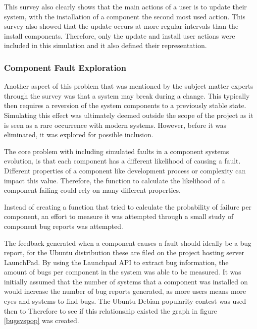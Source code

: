 This survey also clearly shows that the main actions of a user is to update their system,
with the installation of a component the second most used action.
This survey also showed that the update occurs at more regular intervals than the install components.
Therefore, only the update and install user actions were included in this simulation and it also defined their representation. 

\subsubsection{Component Fault Exploration}
Another aspect of this problem that was mentioned by the subject matter experts through the survey was that a system may break during a change.
This typically then requires a reversion of the system components to a previously stable state.
Simulating this effect was ultimately deemed outside the scope of the project as it is seen as a rare occurrence with modern systems.
However, before it was eliminated, it was explored for possible inclusion.

The core problem with including simulated faults in a component systems evolution, is that each component has a different likelihood of causing a fault.
Different properties of a component like development process or complexity can impact this value.
Therefore, the function to calculate the likelihood of a component failing could rely on many different properties.

Instead of creating a function that tried to calculate the probability of failure per component,
an effort to measure it was attempted through a small study of component bug reports was attempted.

The feedback generated when a component causes a fault should ideally be a bug report, for the Ubuntu distribution these are filed on the project hosting server LaunchPad.
By using the Launchpad API to extract bug information, the amount of bugs per component in the system was able to be measured.
It was initially assumed that the number of systems that a component was installed on would increase the number of bug reports generated,
as more users means more eyes and systems to find bugs.
The Ubuntu Debian popularity contest was used then to  
Therefore to see if this relationship existed the graph in figure \ref{bugsvspop} was created.


